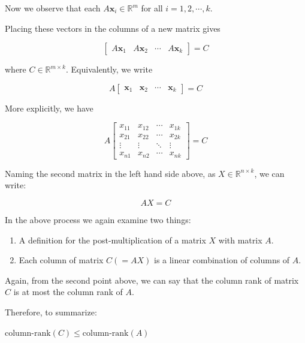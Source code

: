 \documentclass[a4paper]{article}
\begin{document}
Now we observe that each $A\boldsymbol{x}_i \in \mathbb{R}^{m}$ for all $i=1,2,\cdots,k$.

Placing these vectors in the columns of a new matrix gives

\begin{equation} 
\begin{bmatrix}
A\boldsymbol{x}_1 & A\boldsymbol{x}_2 & \cdots & A\boldsymbol{x}_k 
\end{bmatrix} = C
\end{equation}

where $C \in \mathbb{R}^{m \times k}$. 
Equivalently, we write

\begin{equation} 
A\begin{bmatrix}
\boldsymbol{x}_1 & \boldsymbol{x}_2 & \cdots & \boldsymbol{x}_k 
\end{bmatrix} = C
\end{equation}

More explicitly, we have

\begin{equation}
A\begin{bmatrix}
x_{11} & x_{12} & \cdots & x_{1k} \\
x_{21} & x_{22} & \cdots & x_{2k} \\
\vdots & \vdots & \ddots & \vdots \\
x_{n1} & x_{n2} & \cdots & x_{nk}
\end{bmatrix} = C
\end{equation}

Naming the second matrix in the left hand side above, as $X \in \mathbb{R}^{n\times k}$, we can write:

\begin{equation}
AX = C
\end{equation}

In the above process we again examine two things:

\begin{enumerate}
\item A definition for the post-multiplication of a matrix $X$ with matrix $A$.
\item Each column of matrix $C(=AX)$ is a linear combination of columns of $A$.
\end{enumerate}
Again, from the second point above, we can say that the column rank of matrix $C$ is at most the column rank of $A$.

Therefore, to summarize:

$\text{column-rank}(C) \leq \text{column-rank}(A)$
\end{document}
